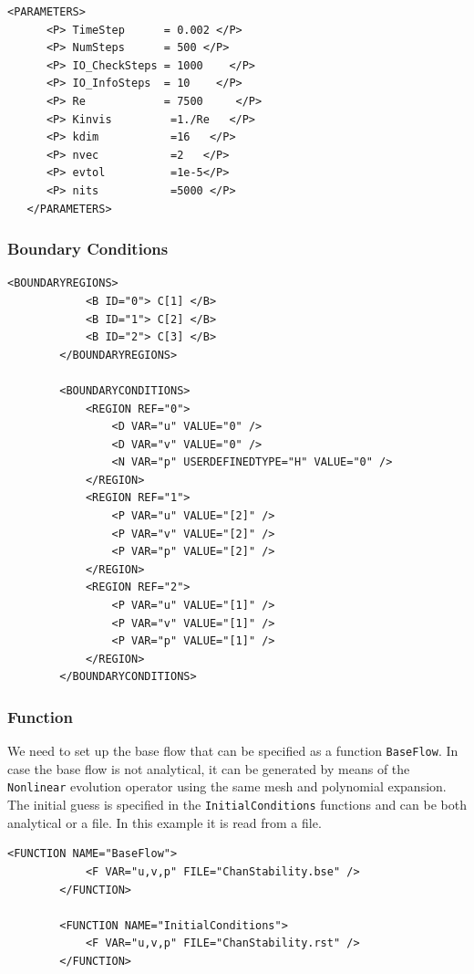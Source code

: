     \begin{lstlisting}[style=XMLStyle]
<PARAMETERS>
      <P> TimeStep      = 0.002 </P>
      <P> NumSteps      = 500 </P>
      <P> IO_CheckSteps = 1000    </P>
      <P> IO_InfoSteps  = 10    </P>
      <P> Re            = 7500     </P>
      <P> Kinvis         =1./Re   </P>
      <P> kdim           =16   </P>
      <P> nvec           =2   </P>
      <P> evtol          =1e-5</P>
      <P> nits           =5000 </P>
   </PARAMETERS>
         \end{lstlisting}
         
         
\subsubsection{Boundary Conditions}

    \begin{lstlisting}[style=XMLStyle]
 <BOUNDARYREGIONS>
            <B ID="0"> C[1] </B>
            <B ID="1"> C[2] </B>
            <B ID="2"> C[3] </B>
        </BOUNDARYREGIONS>

        <BOUNDARYCONDITIONS>
            <REGION REF="0">
                <D VAR="u" VALUE="0" />
                <D VAR="v" VALUE="0" />
                <N VAR="p" USERDEFINEDTYPE="H" VALUE="0" />
            </REGION>
            <REGION REF="1">
                <P VAR="u" VALUE="[2]" />
                <P VAR="v" VALUE="[2]" />
                <P VAR="p" VALUE="[2]" />
            </REGION>
            <REGION REF="2">
                <P VAR="u" VALUE="[1]" />
                <P VAR="v" VALUE="[1]" />
                <P VAR="p" VALUE="[1]" />
            </REGION>
        </BOUNDARYCONDITIONS>
                 \end{lstlisting}

\subsubsection{Function}

We need to set up the base flow that can be specified as a function \texttt{BaseFlow}. In case the base flow is not analytical, it can be generated by means of the \texttt{Nonlinear} evolution operator using the same mesh and polynomial expansion. The initial guess is specified in the \texttt{InitialConditions} functions and can be both analytical or a file. In this example it is read from a file. 

    \begin{lstlisting}[style=XMLStyle]
<FUNCTION NAME="BaseFlow">
            <F VAR="u,v,p" FILE="ChanStability.bse" />
        </FUNCTION>

        <FUNCTION NAME="InitialConditions">
            <F VAR="u,v,p" FILE="ChanStability.rst" />
        </FUNCTION>
                         \end{lstlisting}



